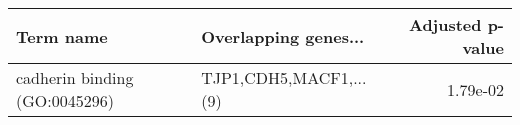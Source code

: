 \begin{tabular}{llr}
\toprule
                    Term name &   Overlapping genes... &  Adjusted p-value \\
\midrule
cadherin binding (GO:0045296) & TJP1,CDH5,MACF1,...(9) &          1.79e-02 \\
\bottomrule
\end{tabular}
